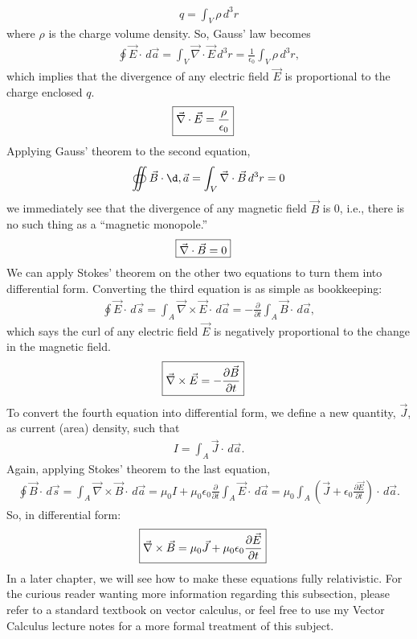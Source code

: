 \documentclass{book}
\theoremstyle{definition}
\begin{document}
\begin{align*}
q = \int_V \rho\,d^3r
\end{align*}
where $\rho$ is the charge volume density. So, Gauss' law becomes
\begin{align*}
\oint \vec{E}\cdot\,d\vec{a} = \int_V \vec{\nabla}\cdot\vec{E}\,d^3r = \frac{1}{\epsilon_0}\int_V\rho\,d^3r,
\end{align*}
which implies that the divergence of any electric field $\vec{E}$ is proportional to the charge enclosed $q$.
\begin{align*}
\Aboxed{\vec{\nabla}\cdot\vec{E} = \frac{\rho}{\epsilon_0}}
\end{align*}
Applying Gauss' theorem to the second equation,
\begin{align*}
\oiint \vec{B}\cdot\d,\vec{a} = \int_V \vec{\nabla}\cdot\vec{B}\,d^3r = 0
\end{align*}
we immediately see that the divergence of any magnetic field $\vec{B}$ is 0, i.e., there is no such thing as a ``magnetic monopole.''
\begin{align*}
\Aboxed{\vec{\nabla}\cdot\vec{B} = 0}
\end{align*}
We can apply Stokes' theorem on the other two equations to turn them into differential form. Converting the third equation is as simple as bookkeeping:
\begin{align*}
\oint \vec{E}\cdot\,d\vec{s} = \int_A\vec{\nabla}\times\vec{E}\cdot\,d\vec{a} = -\frac{\partial}{\partial t}\int_A\vec{B}\cdot\,d\vec{a},
\end{align*}
which says the curl of any electric field $\vec{E}$ is negatively proportional to the change in the magnetic field. 
\begin{align*}
\Aboxed{\vec{\nabla}\times\vec{E} = -\frac{\partial\vec{B}}{\partial t}}
\end{align*}
To convert the fourth equation into differential form, we define a new quantity, $\vec{J}$, as current (area) density, such that
\begin{align*}
I = \int_A \vec{J}\cdot\,d\vec{a}.
\end{align*} 
Again, applying Stokes' theorem to the last equation, 
\begin{align*}
\oint \vec{B}\cdot\,d\vec{s} = \int_A \vec{\nabla}\times\vec{B}\cdot\,d\vec{a} = \mu_0I+\mu_0\epsilon_0\frac{\partial}{\partial t}\int_A\vec{E}\cdot\,d\vec{a} = \mu_0\int_A\left( \vec{J} + \epsilon_0\frac{\partial \vec{E}}{\partial t}\right) \cdot\,d\vec{a}.
\end{align*}
So, in differential form:
\begin{align*}
\Aboxed{\vec{\nabla}\times\vec{B} = \mu_0\vec{J} + \mu_0\epsilon_0\frac{\partial \vec{E}}{\partial t}}
\end{align*}
In a later chapter, we will see how to make these equations fully relativistic. For the curious reader wanting more information regarding this subsection, please refer to a standard textbook on vector calculus, or feel free to use my Vector Calculus lecture notes for a more formal treatment of this subject.
\end{document}
